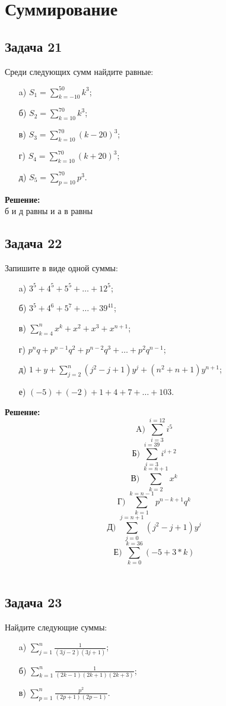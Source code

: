 \documentclass[a4paper,12pt]{article}
\begin{document}
\section{Суммирование}

\subsection{Задача 21}
Среди следующих сумм найдите равные:
\begin{itemize}
    \item[a)] \(S_1 = \sum_{k=-10}^{50} k^3\);
    \item[б)] \(S_2 = \sum_{k=10}^{70} k^3\);
    \item[в)] \(S_3 = \sum_{k=10}^{70} (k - 20)^3\);
    \item[г)] \(S_4 = \sum_{k=10}^{70} (k + 20)^3\);
    \item[д)] \(S_5 = \sum_{p=10}^{70} p^3\).
\end{itemize}

\textbf{Решение:}\\
б и д равны и а в равны
\vspace{1cm}

\subsection{Задача 22}
Запишите в виде одной суммы:
\begin{itemize}
    \item[a)] \(3^5 + 4^5 + 5^5 + \ldots + 12^5\);
    \item[б)] \(3^5 + 4^6 + 5^7 + \ldots + 39^41\);
    \item[в)] \(\sum_{k=4}^{n} x^k + x^2 + x^3 + x^{n+1}\);
    \item[г)] \(p^n q + p^{n-1} q^2 + p^{n-2} q^3 + \ldots + p^2 q^{n-1}\);
    \item[д)] \(1 + y + \sum_{j=2}^{n} (j^2 - j + 1) y^j + (n^2 + n + 1) y^{n+1}\);
    \item[е)] \((-5) + (-2) + 1 + 4 + 7 + \ldots + 103\).
\end{itemize}
\textbf{Решение:}
\[
\text{A) } \sum_{i=3}^{i=12}i^5
\]
\[
\text{Б) } \sum_{i=3}^{i=39}i^{i+2}
\]
\[
\text{В) } \sum_{k=2}^{k=n+1}x^k
\]
\[
\text{Г) } \sum_{k=1}^{k=n-1} p^{n-k+1} q^{k}
\]
\[
\text{Д) } \sum_{j=0}^{j=n+1}(j^2-j+1)y^j
\]
\[
\text{Е) } \sum_{k=0}^{k=36}(-5+3*k)
\]
\
\vspace{1cm}

\subsection{Задача 23}
Найдите следующие суммы:
\begin{itemize}
    \item[a)] \(\sum_{j=1}^{n} \frac{1}{(3j-2)(3j+1)}\);
    \item[б)] \(\sum_{k=1}^{n} \frac{1}{(2k-1)(2k+1)(2k+3)}\);
    \item[в)] \(\sum_{p=1}^{n} \frac{p^2}{(2p+1)(2p-1)}\).
\end{itemize}
\end{document}
